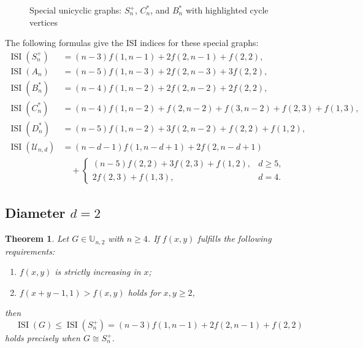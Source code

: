 \documentclass[12pt]{article}
\newtheorem{theorem}{Theorem}[section]
\theoremstyle{definition}
\newcommand{\ISI}{\operatorname{ISI}}
\newcommand{\UU}{\mathbb{U}}
\begin{document}
\begin{figure}[h]
\caption{Special unicyclic graphs: \(S_n^+\), \(C_n^*\), and \(B_n^*\) with highlighted cycle vertices}
\label{fig:unicyclic_special}
\end{figure}

The following formulas give the ISI indices for these special graphs:
\begin{align}
\ISI(S_n^+) &= (n-3)f(1,n-1) + 2f(2,n-1) + f(2,2), \label{eq:Sn}\\
\ISI(A_n) &= (n-5)f(1,n-3) + 2f(2,n-3) + 3f(2,2), \label{eq:An}\\
\ISI(B_n^*) &= (n-4)f(1,n-2) + 2f(2,n-2) + 2f(2,2), \label{eq:Bn}\\
\ISI(C_n^*) &= (n-4)f(1,n-2) + f(2,n-2) + f(3,n-2) + f(2,3) + f(1,3), \label{eq:Cn}\\
\ISI(D_n^*) &= (n-5)f(1,n-2) + 3f(2,n-2) + f(2,2) + f(1,2), \label{eq:Dn}\\
\ISI(\mathcal{U}_{n,d}) &= (n-d-1)f(1,n-d+1) + 2f(2,n-d+1) \nonumber \\
&\quad + 
\begin{cases}
(n-5)f(2,2) + 3f(2,3) + f(1,2), & d \geq 5,\\[4pt]
2f(2,3) + f(1,3), & d = 4.
\end{cases} \label{eq:Un}
\end{align}

\subsection{Diameter \(d = 2\)}

\begin{theorem}
\label{thm:unicyclic_d2}
Let \(G \in \UU_{n,2}\) with \(n \geq 4\). If \(f(x,y)\) fulfills the following requirements:
\begin{enumerate}[label=(\roman*)]
\item \(f(x,y)\) is strictly increasing in \(x\);
\item \(f(x+y-1,1) > f(x,y)\) holds for \(x,y \geq 2\),
\end{enumerate}
then
\begin{equation}
\ISI(G) \leq \ISI(S_n^+) = (n-3)f(1,n-1) + 2f(2,n-1) + f(2,2)
\end{equation}
holds precisely when \(G \cong S_n^+\).
\end{theorem}
\end{document}
